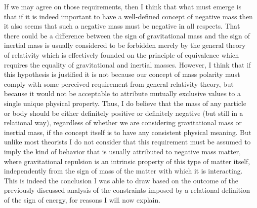 \documentclass[notitlepage,12pt]{report}
\begin{document}
If we may agree on those requirements, then I think that what must emerge is that if it is indeed important to have a well-defined concept of negative mass then it also seems that such a negative mass must be negative in all respects. That there could be a difference between the sign of gravitational mass and the sign of inertial mass is usually considered to be forbidden merely by the general theory of relativity which is effectively founded on the principle of equivalence which requires the equality of gravitational and inertial masses. However, I think that if this hypothesis is justified it is not because our concept of mass polarity must comply with some perceived requirement from general relativity theory, but because it would not be acceptable to attribute mutually exclusive values to a single unique physical property. Thus, I do believe that the mass of any particle or body should be either definitely positive or definitely negative (but still in a relational way), regardless of whether we are considering gravitational mass or inertial mass, if the concept itself is to have any consistent physical meaning. But unlike most theorists I do not consider that this requirement must be assumed to imply the kind of behavior that is usually attributed to negative mass matter, where gravitational repulsion is an intrinsic property of this type of matter itself, independently from the sign of mass of the matter with which it is interacting. This is indeed the conclusion I was able to draw based on the outcome of the previously discussed analysis of the constraints imposed by a relational definition of the sign of energy, for reasons I will now explain.
\end{document}
